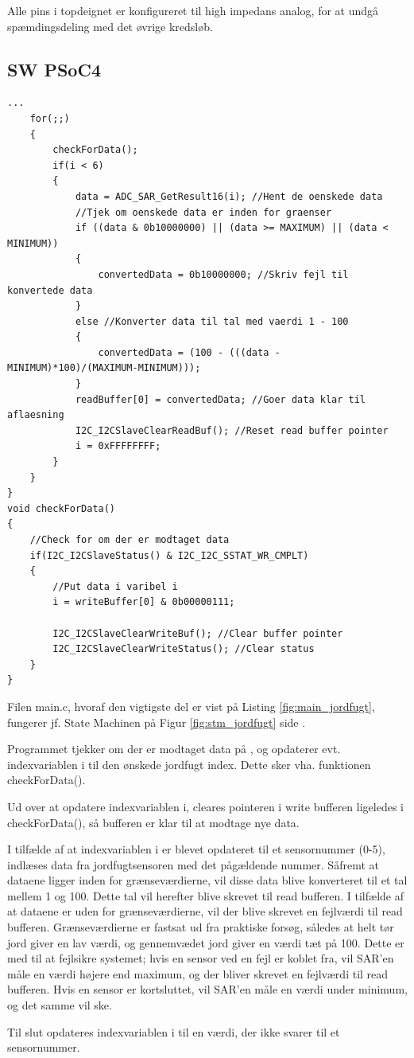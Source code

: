 Alle pins i topdeignet er konfigureret til high impedans analog, for at undgå spæmdingsdeling med det øvrige kredsløb.

\clearpage

\subsection{SW PSoC4}

\begin{lstlisting}[caption=Udsnit af main.c for PSoC4 i Jordfugt, label=fig:main_jordfugt]
...
	for(;;)
    {
        checkForData();
        if(i < 6)
        {
            data = ADC_SAR_GetResult16(i); //Hent de oenskede data
            //Tjek om oenskede data er inden for graenser
            if ((data & 0b10000000) || (data >= MAXIMUM) || (data < MINIMUM)) 
            {
                convertedData = 0b10000000; //Skriv fejl til konvertede data
            }
            else //Konverter data til tal med vaerdi 1 - 100
            {
                convertedData = (100 - (((data - MINIMUM)*100)/(MAXIMUM-MINIMUM))); 
            }
            readBuffer[0] = convertedData; //Goer data klar til aflaesning
            I2C_I2CSlaveClearReadBuf(); //Reset read buffer pointer
            i = 0xFFFFFFFF;
        }
    }
}
void checkForData()
{
    //Check for om der er modtaget data
    if(I2C_I2CSlaveStatus() & I2C_I2C_SSTAT_WR_CMPLT)
    {
        //Put data i varibel i            
        i = writeBuffer[0] & 0b00000111;
        
        I2C_I2CSlaveClearWriteBuf(); //Clear buffer pointer
        I2C_I2CSlaveClearWriteStatus(); //Clear status                               
    }
}
\end{lstlisting}

Filen main.c, hvoraf den vigtigste del er vist på Listing \ref{fig:main_jordfugt}, fungerer jf. State Machinen på Figur \ref{fig:stm_jordfugt} side \pageref{fig:stm_jordfugt}.

Programmet tjekker om der er modtaget data på \IIC, og opdaterer evt. indexvariablen i til den ønskede jordfugt index. Dette sker vha. funktionen checkForData().

Ud over at opdatere indexvariablen i, cleares pointeren i write bufferen ligeledes i checkForData(), så bufferen er klar til at modtage nye data. 

I tilfælde af at indexvariablen i er blevet opdateret til et sensornummer (0-5), indlæses data fra jordfugtsensoren med det pågældende nummer. Såfremt at dataene ligger inden for grænseværdierne, vil disse data blive konverteret til et tal mellem 1 og 100. Dette tal vil herefter blive skrevet til read bufferen.
I tilfælde af at dataene er uden for grænseværdierne, vil der blive skrevet en fejlværdi til read bufferen.
Grænseværdierne er fastsat ud fra praktiske forsøg, således at helt tør jord giver en lav værdi, og gennemvædet jord giver en værdi tæt på 100. 
Dette er med til at fejlsikre systemet; hvis en sensor ved en fejl er koblet fra, vil SAR'en måle en værdi højere end maximum, og der bliver skrevet en fejlværdi til read bufferen. 
Hvis en sensor er kortsluttet, vil SAR'en måle en værdi under minimum, og det samme vil ske. 

Til slut opdateres indexvariablen i til en værdi, der ikke svarer til et sensornummer.

\clearpage